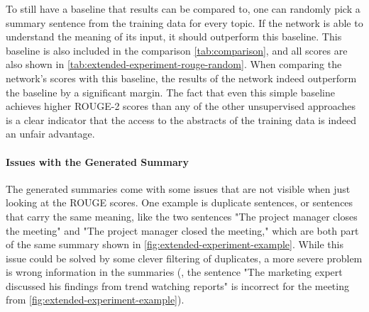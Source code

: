 To still have a baseline that results can be compared to, one can randomly pick a summary sentence from the training data for every topic.
If the network is able to understand the meaning of its input, it should outperform this baseline.
This baseline is also included in the comparison \cref{tab:comparison}, and all scores are also shown in \cref{tab:extended-experiment-rouge-random}.
When comparing the network's scores with this baseline, the results of the network indeed outperform the baseline by a significant margin.
The fact that even this simple baseline achieves higher ROUGE-2 scores than any of the other unsupervised approaches is a clear indicator that the access to the abstracts of the training data is indeed an unfair advantage.

\paragraph{Issues with the Generated Summary}

The generated summaries come with some issues that are not visible when just looking at the ROUGE scores.
One example is duplicate sentences, or sentences that carry the same meaning, like the two sentences "The project manager closes the meeting" and "The project manager closed the meeting," which are both part of the same summary shown in \cref{fig:extended-experiment-example}.
While this issue could be solved by some clever filtering of duplicates, a more severe problem is wrong information in the summaries (\eg, the sentence "The marketing expert discussed his findings from trend watching reports" is incorrect for the meeting from \cref{fig:extended-experiment-example}).